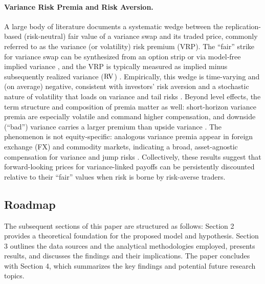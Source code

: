 \paragraph*{Variance Risk Premia and Risk Aversion.}
A large body of literature documents a systematic wedge between the replication-based (risk-neutral) fair value of a variance swap and its traded price, commonly referred to as the variance (or volatility) risk premium (VRP). The ``fair'' strike for variance swap can be synthesized from an option strip \cite{demeterfi1999guide} or via model‐free implied variance \cite{jiang2005modelfree}, and the VRP is typically measured as implied minus subsequently realized variance ($\mathrm{RV}$) \cite{carr2009variance}. Empirically, this wedge is time-varying and (on average) negative, consistent with investors’ risk aversion and a stochastic nature of volatility that loads on variance and tail risks \cite{bakshi2003delta,bollerslev2009expected,broadie2007model,bollerslev2011tails}. Beyond level effects, the term structure and composition of premia matter as well: short-horizon variance premia are especially volatile and command higher compensation, and downside (``bad'') variance carries a larger premium than upside variance \cite{dewbecker2017price,aitsahalia2020term,feunou2018downside}. The phenomenon is not equity‐specific: analogous variance premia appear in foreign exchange (FX) and commodity markets, indicating a broad, asset-agnostic compensation for variance and jump risks \cite{londono2017fxvrp,prokopczuk2017commodityvrp,vantassel2018equityvrp}. Collectively, these results suggest that forward-looking prices for variance-linked payoffs can be persistently discounted relative to their ``fair'' values when risk is borne by risk-averse traders.

\subsection{Roadmap} %
The subsequent sections of this paper are structured as follows: Section 2 provides a theoretical foundation for the proposed model and hypothesis. Section 3 outlines the data sources and the analytical methodologies employed, presents results, and discusses the findings and their implications. The paper concludes with Section 4, which summarizes the key findings and potential future research topics.